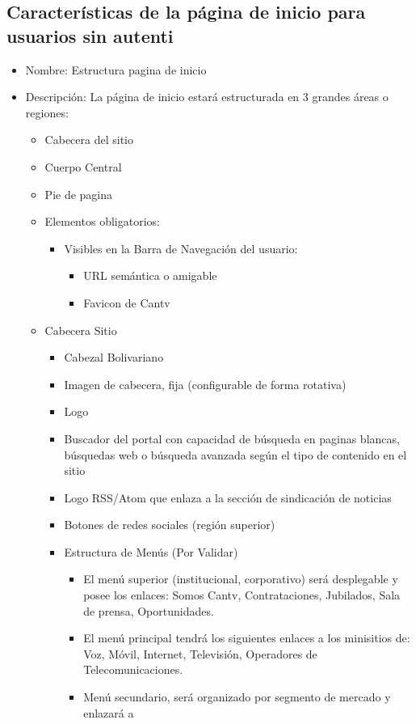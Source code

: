 \documentclass[11pt, letterpaper, oneside, spanish]{scrbook}
\begin{document}
\subsection{Características de la página de inicio para usuarios sin autenti}
\label{sec-2-1-27}

\begin{itemize}
\item Nombre: Estructura pagina de inicio
\item Descripción: La página de inicio estará estructurada en 3 grandes áreas o
  regiones:
\begin{itemize}
\item Cabecera del sitio
\item Cuerpo Central
\item Pie de pagina
\item Elementos obligatorios:
\begin{itemize}
\item Visibles en la Barra de Navegación del usuario:
\begin{itemize}
\item URL semántica o amigable
\item Favicon de Cantv
\end{itemize}
\end{itemize}
\item Cabecera Sitio
\begin{itemize}
\item Cabezal Bolivariano
\item Imagen de cabecera, fija (configurable de forma rotativa)
\item Logo
\item Buscador del portal con capacidad de búsqueda en paginas blancas,
      búsquedas web o búsqueda avanzada según el tipo de contenido en el sitio
\item Logo RSS/Atom que enlaza a la sección de sindicación de noticias
\item Botones de redes sociales (región superior)
\item Estructura de Menús (Por Validar)
\begin{itemize}
\item El menú superior (institucional, corporativo) será desplegable y posee
       los enlaces: Somos Cantv, Contrataciones, Jubilados, Sala de prensa,
       Oportunidades.
\item El menú principal tendrá los siguientes enlaces a los minisitios de:
       Voz, Móvil, Internet, Televisión, Operadores de Telecomunicaciones.
\item Menú secundario, será organizado por segmento de mercado y enlazará a

\end{itemize}
\end{itemize}
\end{itemize}
\end{itemize}
\end{document}
